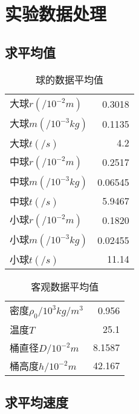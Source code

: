 \documentclass{article}
\begin{document}
\section{实验数据处理}

\subsection{求平均值}

\begin{table}[!hbtp]
    \begin{center}
    \caption{球的数据平均值}
    \begin{tabular}{l|r}

        \hline
        大球$r(/10^{-2}m)$ & 0.3018 \\
        大球$m(/10^{-3}kg)$ & 0.1135 \\
        大球$t(/s)$ & 4.2 \\
        中球$r(/10^{-2}m)$ & 0.2517 \\
        中球$m(/10^{-3}kg)$ & 0.06545 \\
        中球$t(/s)$ & 5.9467 \\
        小球$r(/10^{-2}m)$ & 0.1820 \\
        小球$m(/10^{-3}kg)$ & 0.02455 \\
        小球$t(/s)$ & 11.14 \\

    \end{tabular}
    \end{center}
\end{table}

\begin{table}[!hbtp]
    \begin{center}
    \caption{客观数据平均值}
    \begin{tabular}{l|r}

        \hline
        密度$\rho _0/10^{3}kg/m^3$ &0.956 \\
        温度$T$ & 25.1 \\
        桶直径$D/10^{-2}m$ & 8.1587 \\
        桶高度$h/10^{-2}m$ & 42.167 \\

    \end{tabular}
    \end{center}
\end{table}

\subsection{求平均速度}
\end{document}
